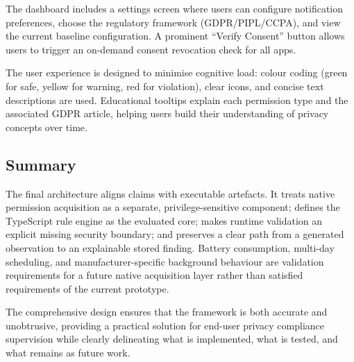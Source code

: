 The dashboard includes a settings screen where users can configure notification preferences, choose the regulatory framework (GDPR/PIPL/CCPA), and view the current baseline configuration. A prominent ``Verify Consent'' button allows users to trigger an on-demand consent revocation check for all apps.

The user experience is designed to minimise cognitive load: colour coding (green for safe, yellow for warning, red for violation), clear icons, and concise text descriptions are used. Educational tooltips explain each permission type and the associated GDPR article, helping users build their understanding of privacy concepts over time.

\subsection{Summary}

The final architecture aligns claims with executable artefacts. It treats native permission acquisition as a separate, privilege-sensitive component; defines the TypeScript rule engine as the evaluated core; makes runtime validation an explicit missing security boundary; and preserves a clear path from a generated observation to an explainable stored finding. Battery consumption, multi-day scheduling, and manufacturer-specific background behaviour are validation requirements for a future native acquisition layer rather than satisfied requirements of the current prototype.

The comprehensive design ensures that the framework is both accurate and unobtrusive, providing a practical solution for end-user privacy compliance supervision while clearly delineating what is implemented, what is tested, and what remains as future work.

